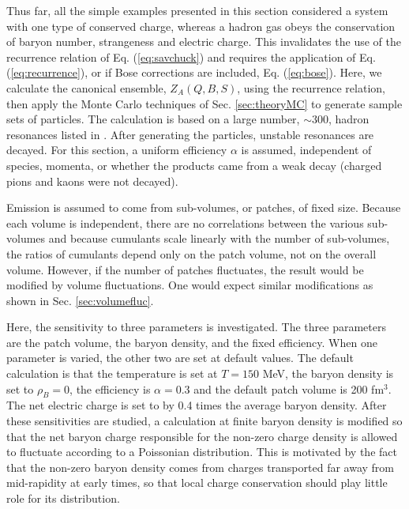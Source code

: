 Thus far, all the simple examples presented in this section considered a system with one type of conserved charge, whereas a hadron gas obeys the conservation of baryon number, strangeness and electric charge. This invalidates the use of the recurrence relation of Eq. (\ref{eq:savchuck}) and requires the application of Eq. (\ref{eq:recurrence}), or if Bose corrections are included, Eq. (\ref{eq:bose}). Here, we calculate the canonical ensemble, $Z_A(Q,B,S)$, using the recurrence relation, then apply the Monte Carlo techniques of Sec. \ref{sec:theoryMC} to generate sample sets of particles. The calculation is based on a large number, $\sim 300$, hadron resonances listed in \cite{Tanabashi:2018oca}. After generating the particles, unstable resonances are decayed. For this section, a uniform efficiency $\alpha$ is assumed, independent of species, momenta, or whether the products came from a weak decay (charged pions and kaons were not decayed).

Emission is assumed to come from sub-volumes, or patches, of fixed size. Because each volume is independent, there are no correlations between the various sub-volumes and because cumulants scale linearly with the number of sub-volumes, the ratios of cumulants depend only on the patch volume, not on the overall volume. However, if the number of patches fluctuates, the result would be modified by volume fluctuations. One would expect similar modifications as shown in Sec. \ref{sec:volumefluc}.

Here, the sensitivity to three parameters is investigated. The three parameters are the patch volume, the baryon density, and the fixed efficiency. When one parameter is varied, the other two are set at default values. The default calculation is that the temperature is set at $T=150$ MeV, the baryon density is set to $\rho_B=0$, the efficiency is $\alpha=0.3$ and the default patch volume is 200 fm$^3$. The net electric charge is set to by 0.4 times the average baryon density. After these sensitivities are studied, a calculation at finite baryon density is modified so that the net baryon charge responsible for the non-zero charge density is allowed to fluctuate according to a Poissonian distribution. This is motivated by the fact that the non-zero baryon density comes from charges transported far away from mid-rapidity at early times, so that local charge conservation should play little role for its distribution.

